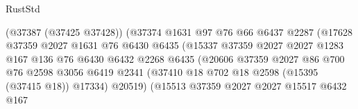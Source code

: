 \begin{lexlean}{RustStd}
\begin{coremodule}
                                      (@37387 (@37425 @37428))
                                      (@37374
                                        @1631
                                        @97
                                        @76
                                        @66
                                        @6437
                                        @2287
                                        (@17628
                                          @37359
                                          @2027
                                          @1631
                                          @76
                                          @6430
                                          @6435
                                          (@15337
                                            @37359
                                            @2027
                                            @2027
                                            @1283
                                            @167
                                            @136
                                            @76
                                            @6430
                                            @6432
                                            @2268
                                            @6435
                                            (@20606
                                              @37359
                                              @2027
                                              @86
                                              @700
                                              @76
                                              @2598
                                              @3056
                                              @6419
                                              @2341
                                              (@37410
                                                @18
                                                @702
                                                @18
                                                @2598
                                                (@15395 (@37415 @18))
                                                @17334)
                                              @20519)
                                            (@15513
                                              @37359
                                              @2027
                                              @2027
                                              @15517
                                              @6432
                                              @167

\end{coremodule}
\end{lexlean}
